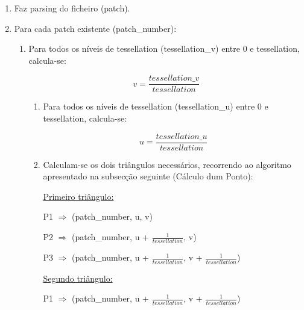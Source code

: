 \documentclass[a4paper]{article}
\begin{document}
\ttfamily
\begin{enumerate}
  \item Faz parsing do ficheiro (patch).
  \item Para cada patch existente (patch\_number):
  \begin{enumerate}
  	\item Para todos os níveis de tessellation (tessellation\_v) entre 0 e tessellation, calcula-se:
	\vspace{0.5cm}

	\hspace{0.0cm} $$v = \frac{tessellation\_v}{tessellation}$$

	\vspace{0.5cm}
	
	\begin{enumerate}
		\item Para todos os níveis de tessellation (tessellation\_u) entre 0 e tessellation, calcula-se:
		\vspace{0.5cm}

		\hspace{0.0cm} $$u = \frac{tessellation\_u}{tessellation}$$

		\vspace{0.5cm}
		\item Calculam-se os dois triângulos necessários, recorrendo ao algoritmo apresentado na subsecção seguinte (Cálculo dum Ponto):
		\vspace{0.3cm}

      		\underline{Primeiro triângulo:}

     		\vspace{0.3cm}

          	P1 $\Rightarrow$ (patch\_number, u, v)

      		\vspace{0.2cm}

          	P2 $\Rightarrow$ (patch\_number, u + $\frac{1}{tessellation}$, v)

      		\vspace{0.2cm}

         	P3 $\Rightarrow$ (patch\_number, u + $\frac{1}{tessellation}$, v + $\frac{1}{tessellation}$)

      		\vspace{0.3cm}
		
		\underline{Segundo triângulo:}

      		\vspace{0.3cm}

          	P1 $\Rightarrow$ (patch\_number, u + $\frac{1}{tessellation}$, v + $\frac{1}{tessellation}$)


\end{enumerate}
\end{enumerate}
\end{enumerate}
\end{document}
